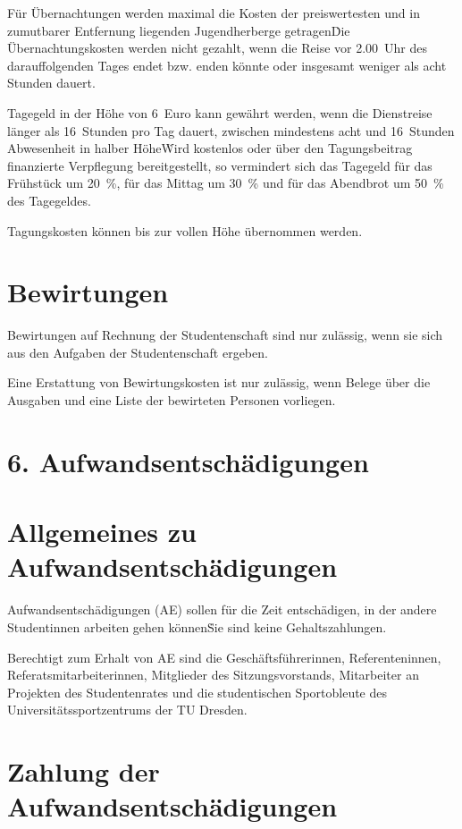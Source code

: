\Abs \Satz Für Übernachtungen werden maximal die Kosten der preiswertesten und in zumutbarer Entfernung liegenden Jugendherberge getragen\. Die Übernachtungskosten werden nicht gezahlt, wenn die Reise vor 2.00~Uhr des darauffolgenden Tages endet bzw. enden könnte oder insgesamt weniger als acht Stunden dauert. 

\Abs \Satz Tagegeld in der Höhe von 6~Euro kann gewährt werden, wenn die Dienstreise länger als 16~Stunden pro Tag dauert, zwischen mindestens acht und 16~Stunden Abwesenheit in halber Höhe\. Wird kostenlos oder über den Tagungsbeitrag finanzierte Verpflegung bereitgestellt, so vermindert sich das Tagegeld für das Frühstück um 20~\%, für das Mittag um 30~\% und für das Abendbrot um 50~\% des Tagegeldes.

\Abs \Satz Tagungskosten können bis zur vollen Höhe übernommen werden.

\section{Bewirtungen}

\Abs \Satz Bewirtungen auf Rechnung der Studentenschaft sind nur zulässig, wenn sie sich aus den Aufgaben der Studentenschaft ergeben.

\Abs \Satz Eine Erstattung von Bewirtungskosten ist nur zulässig, wenn Belege über die Ausgaben und eine Liste der bewirteten Personen vorliegen.


\section*{6. Aufwandsentschädigungen}



\section{Allgemeines zu Aufwandsentschädigungen}

\Abs \Satz Aufwandsentschädigungen (AE) sollen für die Zeit entschädigen, in der andere Studentinnen arbeiten gehen können\. Sie sind keine Gehaltszahlungen.

\Abs \Satz Berechtigt zum Erhalt von AE sind die Geschäftsführerinnen, Referenteninnen, Referatsmitarbeiterinnen, Mitglieder des Sitzungsvorstands, Mitarbeiter an Projekten des Studentenrates und die studentischen Sportobleute des Universitätssportzentrums der TU Dresden.



\section{Zahlung der Aufwandsentschädigungen}

